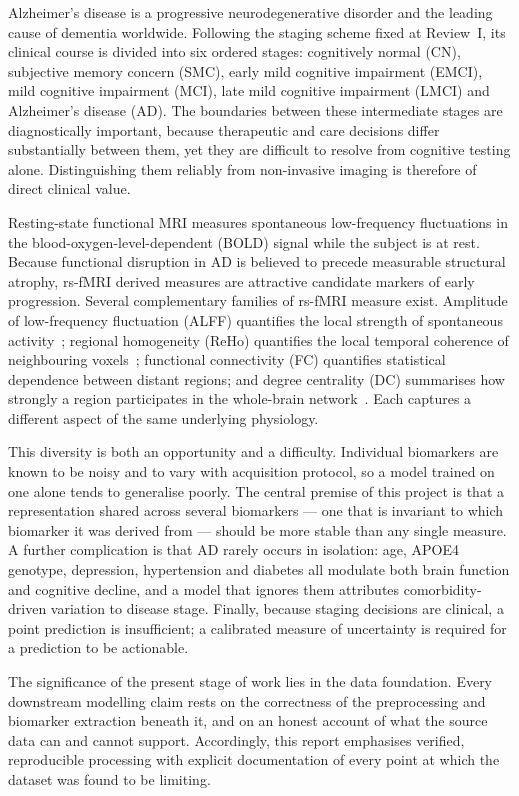 \documentclass{ssnreview}
\begin{document}
Alzheimer's disease is a progressive neurodegenerative disorder and the leading
cause of dementia worldwide. Following the staging scheme fixed at Review~I, its
clinical course is divided into six ordered stages: cognitively normal (CN),
subjective memory concern (SMC), early mild cognitive impairment (EMCI), mild
cognitive impairment (MCI), late mild cognitive impairment (LMCI) and Alzheimer's
disease (AD). The boundaries between these
intermediate stages are diagnostically important, because therapeutic and care
decisions differ substantially between them, yet they are difficult to resolve from
cognitive testing alone. Distinguishing them reliably from non-invasive imaging is
therefore of direct clinical value.

Resting-state functional MRI measures spontaneous low-frequency fluctuations in the
blood-oxygen-level-dependent (BOLD) signal while the subject is at rest. Because
functional disruption in AD is believed to precede measurable structural atrophy,
rs-fMRI derived measures are attractive candidate markers of early progression.
Several complementary families of rs-fMRI measure exist. Amplitude of
low-frequency fluctuation (ALFF) quantifies the local strength of spontaneous
activity~\cite{alff}; regional homogeneity (ReHo) quantifies the local temporal
coherence of neighbouring voxels~\cite{reho}; functional connectivity (FC)
quantifies statistical dependence between distant regions; and degree centrality
(DC) summarises how strongly a region participates in the whole-brain
network~\cite{centrality}. Each captures a different aspect of the same underlying
physiology.

This diversity is both an opportunity and a difficulty. Individual biomarkers are
known to be noisy and to vary with acquisition protocol, so a model trained on one
alone tends to generalise poorly. The central premise of this project is that a
representation shared across several biomarkers --- one that is invariant to which
biomarker it was derived from --- should be more stable than any single measure. A
further complication is that AD rarely occurs in isolation: age, APOE4 genotype,
depression, hypertension and diabetes all modulate both brain function and cognitive
decline, and a model that ignores them attributes comorbidity-driven variation to
disease stage. Finally, because staging decisions are clinical, a point prediction
is insufficient; a calibrated measure of uncertainty is required for a prediction to
be actionable.

The significance of the present stage of work lies in the data foundation. Every
downstream modelling claim rests on the correctness of the preprocessing and
biomarker extraction beneath it, and on an honest account of what the source data
can and cannot support. Accordingly, this report emphasises verified, reproducible
processing with explicit documentation of every point at which the dataset was found
to be limiting.
\end{document}
